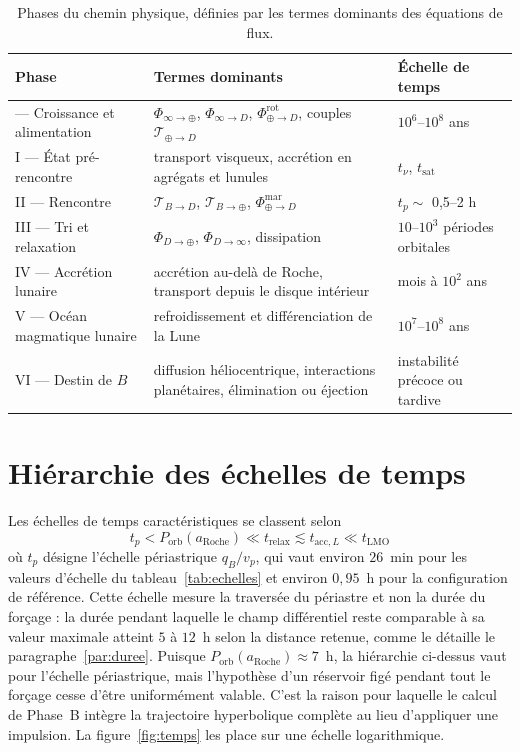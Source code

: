 \documentclass[11pt,a4paper,openany]{report}
\newcommand{\aR}{a_{\mathrm{Roche}}}
\begin{document}
\begin{table}[htbp]
\centering
\small
\caption{Phases du chemin physique, définies par les termes dominants des équations de flux.}
\label{tab:phases}
\begin{tabularx}{\textwidth}{>{\raggedright\arraybackslash}p{3.1cm}
>{\raggedright\arraybackslash}X >{\raggedright\arraybackslash}p{3.6cm}}
\toprule
\textbf{Phase} & \textbf{Termes dominants} & \textbf{Échelle de temps} \\
\midrule
0 --- Croissance et alimentation & $\Phi_{\infty\to\oplus}$, $\Phi_{\infty\to D}$, $\Phi^{\mathrm{rot}}_{\oplus\to D}$, couples $\mathcal{T}_{\oplus\to D}$ & $10^{6}$--$10^{8}$ ans \\
I --- État pré-rencontre & transport visqueux, accrétion en agrégats et lunules & $t_\nu$, $t_{\mathrm{sat}}$ \\
II --- Rencontre & $\mathcal{T}_{B\to D}$, $\mathcal{T}_{B\to\oplus}$, $\Phi^{\mathrm{mar}}_{\oplus\to D}$ & $t_{p}\sim$ 0,5--2 h \\
III --- Tri et relaxation & $\Phi_{D\to\oplus}$, $\Phi_{D\to\infty}$, dissipation & $10$--$10^{3}$ périodes orbitales \\
IV --- Accrétion lunaire & accrétion au-delà de Roche, transport depuis le disque intérieur & mois à $10^{2}$ ans \\
V --- Océan magmatique lunaire & refroidissement et différenciation de la Lune & $10^{7}$--$10^{8}$ ans \\
VI --- Destin de $B$ & diffusion héliocentrique, interactions planétaires, élimination ou éjection & instabilité précoce ou tardive \\
\bottomrule
\end{tabularx}
\end{table}

\section{Hiérarchie des échelles de temps}

Les échelles de temps caractéristiques se classent selon
\begin{equation}
\boxed{\;t_{p}<P_{\mathrm{orb}}(\aR)\ll t_{\mathrm{relax}}\lesssim t_{\mathrm{acc},L}
\ll t_{\mathrm{LMO}}\;}
\label{eq:hierarchie-temps}
\end{equation}
où $t_{p}$ désigne l'échelle périastrique $q_B/v_p$, qui vaut environ $26$~min pour les
valeurs d'échelle du tableau~\ref{tab:echelles} et environ $0{,}95$~h pour la configuration de
référence. Cette échelle mesure la traversée du périastre et non la durée du forçage : la durée
pendant laquelle le champ différentiel reste comparable à sa valeur maximale atteint $5$ à $12$~h
selon la distance retenue, comme le détaille le paragraphe~\ref{par:duree}. Puisque
$P_{\mathrm{orb}}(\aR)\approx7$~h, la hiérarchie ci-dessus vaut pour l'échelle périastrique, mais
l'hypothèse d'un réservoir figé pendant tout le forçage cesse d'être uniformément valable. C'est
la raison pour laquelle le calcul de Phase~B intègre la trajectoire hyperbolique complète au lieu
d'appliquer une impulsion. La figure~\ref{fig:temps} les place sur une échelle logarithmique.
\end{document}
